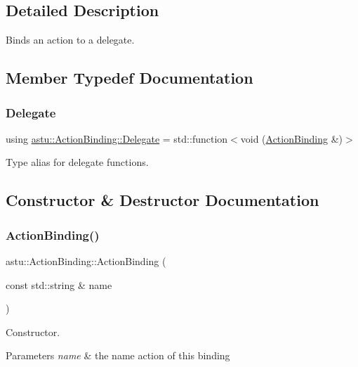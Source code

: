 \subsection{Detailed Description}
Binds an action to a delegate. 

\subsection{Member Typedef Documentation}
\mbox{\label{classastu_1_1ActionBinding_ab0e27e5c54f264cb2aa36f65ead9e4ae}} 
\subsubsection{\texorpdfstring{Delegate}{Delegate}}
{\footnotesize\ttfamily using \hyperlink{classastu_1_1ActionBinding_ab0e27e5c54f264cb2aa36f65ead9e4ae}{astu\+::\+Action\+Binding\+::\+Delegate} =  std\+::function$<$void (\hyperlink{classastu_1_1ActionBinding}{Action\+Binding} \&)$>$}

Type alias for delegate functions. 

\subsection{Constructor \& Destructor Documentation}
\mbox{\label{classastu_1_1ActionBinding_a087e1a63f4ae5394a7bfd8a93789eccd}} 
\subsubsection{\texorpdfstring{Action\+Binding()}{ActionBinding()}}
{\footnotesize\ttfamily astu\+::\+Action\+Binding\+::\+Action\+Binding (\begin{DoxyParamCaption}\item[{const std\+::string \&}]{name }\end{DoxyParamCaption})}

Constructor.


\begin{DoxyParams}{Parameters}
{\em name} & the name action of this binding \\
\hline
\end{DoxyParams}


